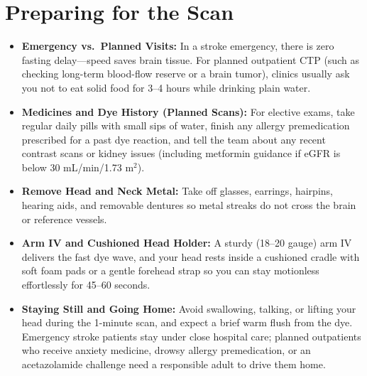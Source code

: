 \section{Preparing for the Scan}
\begin{itemize}
    \item \textbf{Emergency vs.\ Planned Visits:} In a stroke emergency, there is zero fasting delay---speed saves brain tissue. For planned outpatient CTP (such as checking long-term blood-flow reserve or a brain tumor), clinics usually ask you not to eat solid food for 3--4 hours while drinking plain water.
    \item \textbf{Medicines and Dye History (Planned Scans):} For elective exams, take regular daily pills with small sips of water, finish any allergy premedication prescribed for a past dye reaction, and tell the team about any recent contrast scans or kidney issues (including metformin guidance if eGFR is below 30 mL/min/1.73 m$^2$).
    \item \textbf{Remove Head and Neck Metal:} Take off glasses, earrings, hairpins, hearing aids, and removable dentures so metal streaks do not cross the brain or reference vessels.
    \item \textbf{Arm IV and Cushioned Head Holder:} A sturdy (18--20 gauge) arm IV delivers the fast dye wave, and your head rests inside a cushioned cradle with soft foam pads or a gentle forehead strap so you can stay motionless effortlessly for 45--60 seconds.
    \item \textbf{Staying Still and Going Home:} Avoid swallowing, talking, or lifting your head during the 1-minute scan, and expect a brief warm flush from the dye. Emergency stroke patients stay under close hospital care; planned outpatients who receive anxiety medicine, drowsy allergy premedication, or an acetazolamide challenge need a responsible adult to drive them home.
\end{itemize}

